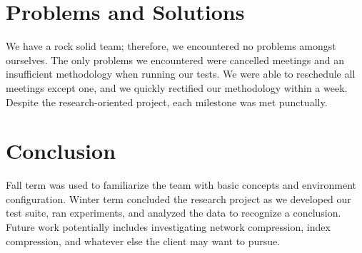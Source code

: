 \documentclass[10pt]{article}
\begin{document}
\section{Problems and Solutions}
We have a rock solid team; therefore, we encountered no problems amongst ourselves. The only problems we encountered were cancelled meetings and an insufficient methodology when running our tests. We were able to reschedule all meetings except one, and we quickly rectified our methodology within a week. Despite the research-oriented project, each milestone was met punctually.

\section{Conclusion}
Fall term was used to familiarize the team with basic concepts and environment configuration. Winter term concluded the research project as we developed our test suite, ran experiments, and analyzed the data to recognize a conclusion. Future work potentially includes investigating network compression, index compression, and whatever else the client may want to pursue.
\end{document}
